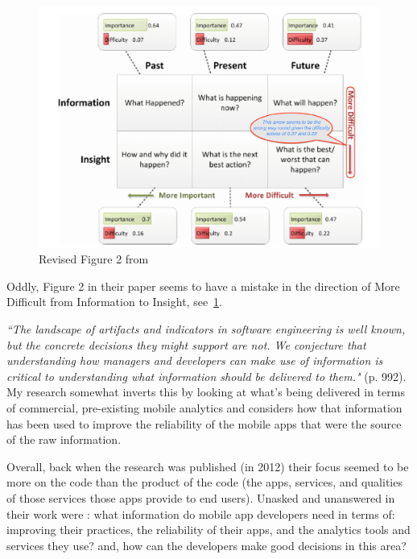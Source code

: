 \begin{figure}
    \centering
    \includegraphics[width=\linewidth]{images/related-work/buse2012-edited-figure-2.pdf}
    \caption[Analytical questions, adapted from \cite{buse2012_information_needs_for_software_development_analytics}]{Revised Figure 2 from \cite{buse2012_information_needs_for_software_development_analytics}}
    \label{fig:buse2012-edited-figure-2}
\end{figure}

Oddly, Figure 2 in their paper seems to have a mistake in the direction of More Difficult from Information to Insight, see~\ref{fig:buse2012-edited-figure-2}.

\emph{``The landscape of artifacts and indicators in software engineering is well known, but the concrete decisions they might support are not. We conjecture that understanding how managers and developers can make use of information is critical to understanding what information should be delivered to them."} (p. 992). 
My research somewhat inverts this by looking at what's being delivered in terms of commercial, pre-existing mobile analytics and considers how that information has been used to improve the reliability of the mobile apps that were the source of the raw information.

Overall, back when the research was published (in 2012) their focus seemed to be more on the code than the product of the code (the apps, services, and qualities of those services those apps provide to end users). Unasked and unanswered in their work were : what information do mobile app developers need in terms of: improving their practices, the reliability of their apps, and the analytics tools and services they use? and, how can the developers make good decisions in this area?

